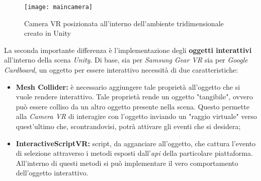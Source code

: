 \label{MainCamera}
\begin{figure}[ht]
	\begin{center}
		\texttt{[image: maincamera]}
		\caption{Camera VR posizionata all'interno dell'ambiente tridimensionale creato in Unity}
	\end{center}
\end{figure}
\FloatBarrier

La seconda importante differenza è l'implementazione degli \textbf{oggetti interattivi} all'interno della scena \textit{Unity}. Di base, sia per \textit{Samsung Gear VR} sia per \textit{Google Cardboard}, un oggetto per essere interattivo necessità di due caratteristiche:

\begin{itemize}
	\item \textbf{Mesh Collider:} è necessario aggiungere tale proprietà all'oggetto che si vuole rendere interattivo. Tale proprietà rende un oggetto "tangibile", ovvero può essere colliso da un altro oggetto presente nella scena. Questo permette alla \textit{Camera VR} di interagire con l'oggetto inviando un "raggio virtuale" verso quest'ultimo che, scontrandovisi, potrà attivare gli eventi che si desidera;
	\item \textbf{InteractiveScriptVR:} script, da agganciare all'oggetto, che cattura l'evento di selezione attraverso i metodi esposti dall'\textit{api} della particolare piattaforma. All'interno di questi metodi si può implementare il vero comportamento dell'oggetto interattivo.  
\end{itemize}

